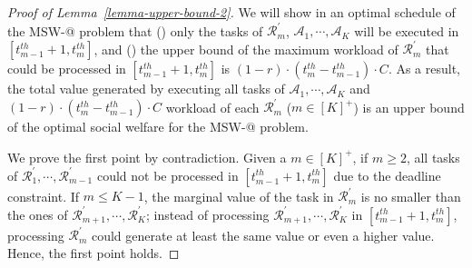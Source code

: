 \documentclass[10pt,journal,compsoc]{IEEEtran}
\makeatletter
\newcommand{\rmnum}[1]{\romannumeral #1}
\newcommand{\Rmnum}[1]{\expandafter\@slowromancap\romannumeral #1@}
\makeatother
\begin{document}
\begin{proof}[Proof of Lemma~\ref{lemma-upper-bound-2}]
We will show in an optimal schedule of the MSW-\Rmnum{2} problem that (\rmnum{1}) only the tasks of $\mathcal{R}_{m}^{\prime}$, $\mathcal{A}_{1}, \cdots, \mathcal{A}_{K}$ will be executed in $[t_{m-1}^{th}+1, t_{m}^{th}]$, and (\rmnum{2}) the upper bound of the maximum workload of $\mathcal{R}_{m}^{\prime}$ that could be processed in $[t_{m-1}^{th}+1, t_{m}^{th}]$ is $(1-r)\cdot(t_{m}^{th}-t_{m-1}^{th})\cdot C$. As a result, the total value generated by executing all tasks of $\mathcal{A}_{1}, \cdots, \mathcal{A}_{K}$ and $(1-r)\cdot(t_{m}^{th}-t_{m-1}^{th})\cdot C$ workload of each $\mathcal{R}_{m}^{\prime}$ ($m\in [K]^{+}$) is an upper bound of the optimal social welfare for the MSW-\Rmnum{2} problem.


We prove the first point by contradiction. Given a $m\in [K]^{+}$, if $m\geq 2$, all tasks of $\mathcal{R}_{1}^{\prime}, \cdots, \mathcal{R}_{m-1}^{\prime}$ could not be processed in $[t_{m-1}^{th}+1, t_{m}^{th}]$ due to the deadline constraint. If $m\leq K-1$, the marginal value of the task in $\mathcal{R}_{m}^{\prime}$ is no smaller than the ones of $\mathcal{R}_{m+1}^{\prime}, \cdots, \mathcal{R}_{K}^{\prime}$; instead of processing $\mathcal{R}_{m+1}^{\prime}, \cdots, \mathcal{R}_{K}^{\prime}$ in $[t_{m-1}^{th}+1, t_{m}^{th}]$, processing $\mathcal{R}_{m}^{\prime}$ could generate at least the same value or even a higher value. Hence, the first point holds.



\end{proof}
\end{document}

